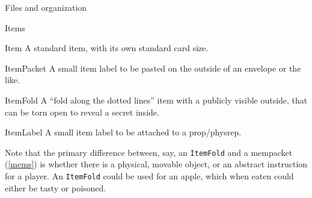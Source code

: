 \documentclass[sheet]{GameTexBase}
\begin{document}
\begin{section}{Files and organization}
\begin{subsection}{Items}
\begin{desc}
\item[Item] A standard item, with its own standard card size.
\item[ItemPacket] A small item label to be pasted on the outside of an envelope or the like.
\item[ItemFold] A ``fold along the dotted lines'' item with a publicly visible outside, that can be torn open to reveal a secret inside.
\item[ItemLabel] A small item label to be attached to a prop/physrep.
\end{desc}

Note that the primary difference between, say, an \lstinline|ItemFold| and a mempacket (\ref{mems}) is whether there is a physical, movable object, or an abstract instruction for a player.  An \lstinline|ItemFold| could be used for an apple, which when eaten could either be tasty or poisoned.


\end{subsection}
\end{section}
\end{document}
